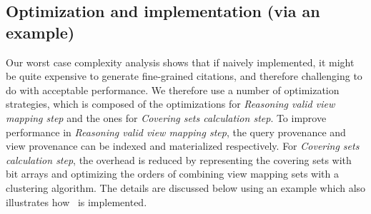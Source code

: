 \subsection{Optimization and implementation (via an example)}
Our worst case complexity analysis shows that if naively implemented, it might be quite expensive to generate fine-grained citations, and therefore challenging to do with acceptable performance. We therefore use a number of optimization strategies, which is composed of the optimizations for {\em Reasoning valid view mapping step} and the ones for {\em Covering sets calculation step}. To improve performance in {\em Reasoning valid view mapping step}, the query provenance and view provenance can be indexed and materialized respectively. For {\em Covering sets calculation step}, the overhead is reduced by representing the covering sets with bit arrays and optimizing the orders of combining view mapping sets with a clustering algorithm. The details are discussed below using an example which also illustrates how \provalg\ is implemented. 
